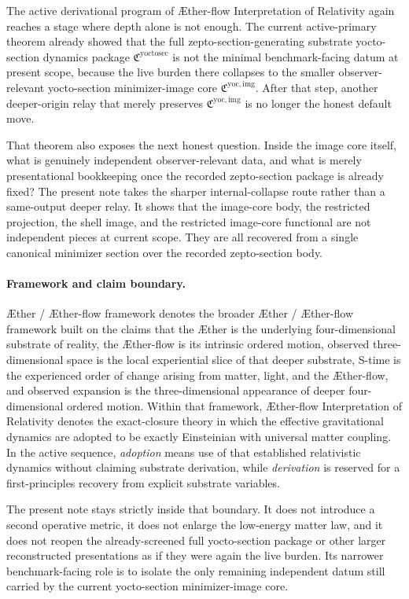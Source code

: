\documentclass[11pt]{article}
\newcommand{\Aether}{\AE{}ther}
\newcommand{\Aflow}{\AE{}ther-flow}
\newcommand{\TheoryName}{\Aflow{} Interpretation of Relativity}
\newcommand{\TheoryProgram}{\Aether{} / \Aflow{} framework}
\newcommand{\YoctoSectionPackage}{\mathfrak C^{\mathrm{yoctosec}}}
\newcommand{\YoctoImageCore}{\mathfrak C^{\mathrm{yoc,img}}}
\begin{document}
The active derivational program of \TheoryName{} again reaches a stage where depth alone is not enough. The current active-primary theorem already showed that the full zepto-section-generating substrate yocto-section dynamics package \(\YoctoSectionPackage\) is not the minimal benchmark-facing datum at present scope, because the live burden there collapses to the smaller observer-relevant yocto-section minimizer-image core \(\YoctoImageCore\). After that step, another deeper-origin relay that merely preserves \(\YoctoImageCore\) is no longer the honest default move.

That theorem also exposes the next honest question. Inside the image core itself, what is genuinely independent observer-relevant data, and what is merely presentational bookkeeping once the recorded zepto-section package is already fixed? The present note takes the sharper internal-collapse route rather than a same-output deeper relay. It shows that the image-core body, the restricted projection, the shell image, and the restricted image-core functional are not independent pieces at current scope. They are all recovered from a single canonical minimizer section over the recorded zepto-section body.

\paragraph{Framework and claim boundary.}
\TheoryProgram{} denotes the broader \Aether{} / \Aflow{} framework built on the claims that the \Aether{} is the underlying four-dimensional substrate of reality, the \Aflow{} is its intrinsic ordered motion, observed three-dimensional space is the local experiential slice of that deeper substrate, S-time is the experienced order of change arising from matter, light, and the \Aflow{}, and observed expansion is the three-dimensional appearance of deeper four-dimensional ordered motion. Within that framework, \TheoryName{} denotes the exact-closure theory in which the effective gravitational dynamics are adopted to be exactly Einsteinian with universal matter coupling. In the active sequence, \emph{adoption} means use of that established relativistic dynamics without claiming substrate derivation, while \emph{derivation} is reserved for a first-principles recovery from explicit substrate variables.

The present note stays strictly inside that boundary. It does not introduce a second operative metric, it does not enlarge the low-energy matter law, and it does not reopen the already-screened full yocto-section package or other larger reconstructed presentations as if they were again the live burden. Its narrower benchmark-facing role is to isolate the only remaining independent datum still carried by the current yocto-section minimizer-image core.
\end{document}
